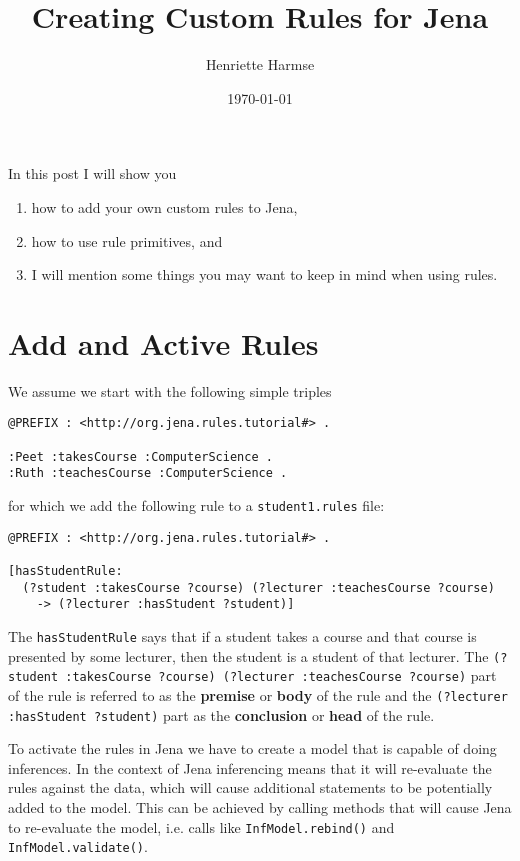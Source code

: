 \documentclass{amsart}
\title{Creating Custom Rules for Jena}
\author{Henriette Harmse}
\date{\today}
\begin{document}
  \maketitle
  
  In this post I will show you
  \begin{enumerate}
   \item how to add your own custom rules to Jena,
   \item how to use rule primitives, and
   \item I will mention some things you may want to keep in mind when using rules. 
  \end{enumerate}

  \section{Add and Active Rules}
  We assume we start with the following simple triples

\begin{small}
\begin{verbatim}
@PREFIX : <http://org.jena.rules.tutorial#> .
 
:Peet :takesCourse :ComputerScience .
:Ruth :teachesCourse :ComputerScience . 
\end{verbatim}
\end{small}

  for which we add the following rule to a \texttt{student1.rules} file:

\begin{small}
\begin{verbatim}
@PREFIX : <http://org.jena.rules.tutorial#> .

[hasStudentRule: 
  (?student :takesCourse ?course) (?lecturer :teachesCourse ?course) 
    -> (?lecturer :hasStudent ?student)]  
\end{verbatim}
\end{small}

The \texttt{hasStudentRule} says that if a student takes a course and that course is presented by some lecturer, then the student is a student of that lecturer. The
\texttt{(?student :takesCourse ?course) (?lecturer :teachesCourse ?course)}
part of the rule is referred to as the \textbf{premise} or \textbf{body} of the rule and the
\texttt{(?lecturer :hasStudent ?student)} part as the \textbf{conclusion} or \textbf{head} of the rule.

To activate the rules in Jena we have to create a model that is capable of doing inferences. In the context of Jena inferencing means that it will re-evaluate the rules against the data, which will cause additional statements to be potentially added to the model. This can be achieved by calling methods that will cause Jena to re-evaluate the model, i.e. calls like \texttt{InfModel.rebind()} and \texttt{InfModel.validate()}.
\end{document}
